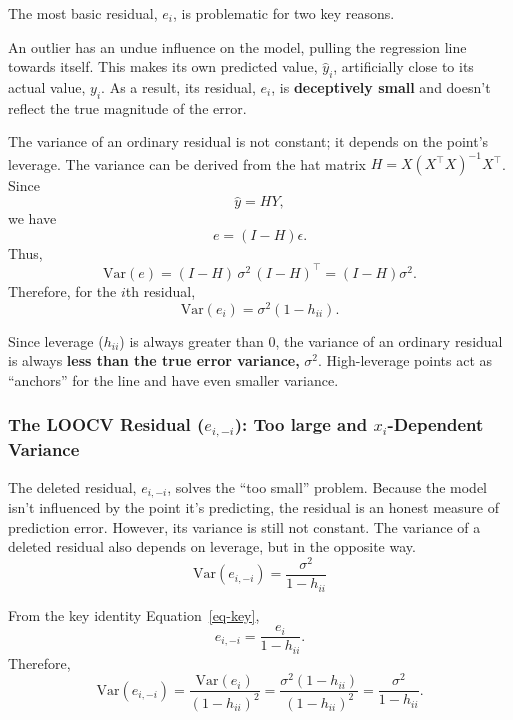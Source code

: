 \documentclass[
  letterpaper,
  DIV=11,
  numbers=noendperiod]{scrreprt}
\begin{document}
The most basic residual, \(e_i\), is problematic for two key reasons.

An outlier has an undue influence on the model, pulling the regression
line towards itself. This makes its own predicted value, \(\hat{y}_i\),
artificially close to its actual value, \(y_i\). As a result, its
residual, \(e_i\), is \textbf{deceptively small} and doesn't reflect the
true magnitude of the error.

The variance of an ordinary residual is not constant; it depends on the
point's leverage. The variance can be derived from the hat matrix
\(H = X(X^\top X)^{-1}X^\top\). Since \[\hat{y} = HY,\] we have
\begin{equation}
e = (I - H)\epsilon.
\end{equation} Thus, \begin{equation}
\mathrm{Var}(e) = (I-H)\,\sigma^2\,(I-H)^\top = (I-H)\sigma^2.
\end{equation} Therefore, for the \(i\)th residual, \begin{equation}
\mathrm{Var}(e_i) = \sigma^2(1 - h_{ii}).
\end{equation}

Since leverage (\(h_{ii}\)) is always greater than 0, the variance of an
ordinary residual is always \textbf{less than the true error variance,}
\(\sigma^2\). High-leverage points act as ``anchors'' for the line and
have even smaller variance.

\subsubsection{\texorpdfstring{\textbf{The LOOCV Residual
(}\(e_{i,-i}\)): Too large and \(x_i\)-Dependent
Variance}{The LOOCV Residual (e\_\{i,-i\}): Too large and x\_i-Dependent Variance}}\label{the-loocv-residual-e_i-i-too-large-and-x_i-dependent-variance}

The deleted residual, \(e_{i,-i}\), solves the ``too small'' problem.
Because the model isn't influenced by the point it's predicting, the
residual is an honest measure of prediction error. However, its variance
is still not constant. The variance of a deleted residual also depends
on leverage, but in the opposite way. \begin{equation}
    \text{Var}(e_{i,-i}) = \frac{\sigma^2}{1 - h_{ii}}
    \end{equation}

From the key identity Equation~\ref{eq-key}, \begin{equation}
e_{i,-i} = \frac{e_i}{1 - h_{ii}}.
\end{equation} Therefore, \begin{equation}
\mathrm{Var}(e_{i,-i}) = \frac{\mathrm{Var}(e_i)}{(1-h_{ii})^2}
= \frac{\sigma^2(1-h_{ii})}{(1-h_{ii})^2}
= \frac{\sigma^2}{1-h_{ii}}.
\end{equation}
\end{document}
